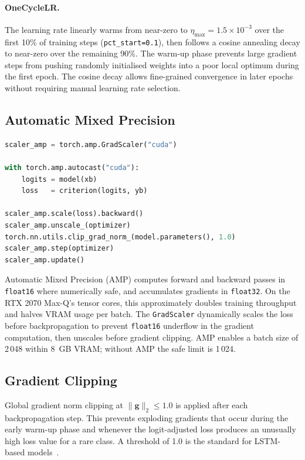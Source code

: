 \documentclass[12pt]{article}
\theoremstyle{plain}
\begin{document}
\paragraph{OneCycleLR.} The learning rate linearly warms from near-zero to $\eta_{\max} = 1.5 \times 10^{-3}$ over the first 10\% of training steps (\texttt{pct\_start=0.1}), then follows a cosine annealing decay to near-zero over the remaining 90\%. The warm-up phase prevents large gradient steps from pushing randomly initialised weights into a poor local optimum during the first epoch. The cosine decay allows fine-grained convergence in later epochs without requiring manual learning rate selection.

\subsection{Automatic Mixed Precision}

\begin{lstlisting}[language=Python, caption={AMP training loop with GradScaler.}]
scaler_amp = torch.amp.GradScaler("cuda")

with torch.amp.autocast("cuda"):
    logits = model(xb)
    loss   = criterion(logits, yb)

scaler_amp.scale(loss).backward()
scaler_amp.unscale_(optimizer)
torch.nn.utils.clip_grad_norm_(model.parameters(), 1.0)
scaler_amp.step(optimizer)
scaler_amp.update()
\end{lstlisting}

Automatic Mixed Precision (AMP) computes forward and backward passes in \texttt{float16} where numerically safe, and accumulates gradients in \texttt{float32}. On the RTX 2070 Max-Q's tensor cores, this approximately doubles training throughput and halves VRAM usage per batch. The \texttt{GradScaler} dynamically scales the loss before backpropagation to prevent \texttt{float16} underflow in the gradient computation, then unscales before gradient clipping. AMP enables a batch size of 2\,048 within 8~GB VRAM; without AMP the safe limit is 1\,024.

\subsection{Gradient Clipping}

Global gradient norm clipping at $\|\mathbf{g}\|_2 \leq 1.0$ is applied after each backpropagation step. This prevents exploding gradients that occur during the early warm-up phase and whenever the logit-adjusted loss produces an unusually high loss value for a rare class. A threshold of 1.0 is the standard for LSTM-based models~\cite{Pascanu2013}.
\end{document}
